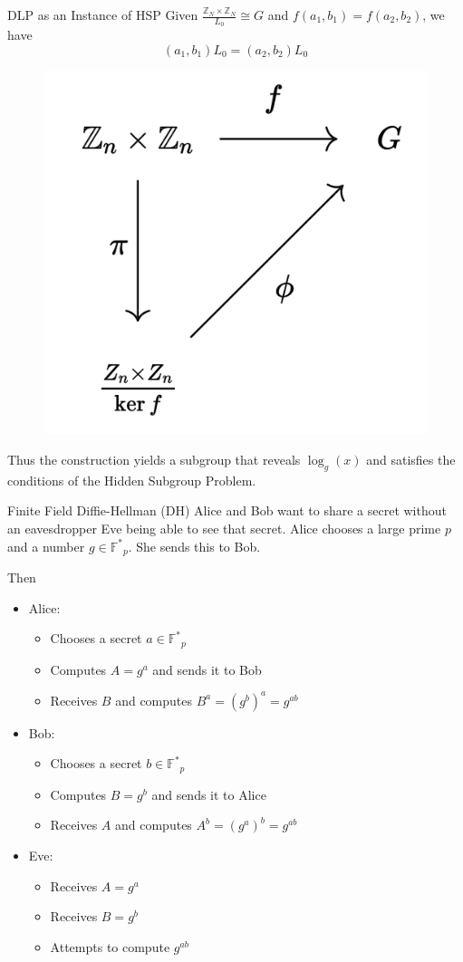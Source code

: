 \documentclass{beamer}
\begin{document}
\begin{frame}{DLP as an Instance of HSP}
    Given $\frac{\mathbb{Z}_N \times \mathbb{Z}_N}{L_0} \cong G$ and $f(a_1, b_1) = f(a_2,b_2)$, we have 
    \[(a_1, b_1)L_0 = (a_2,b_2)L_0\]
    \begin{figure}
        \centering
        \includegraphics[width=0.4\linewidth]{figures/cd.png}
    \end{figure}
    Thus the construction yields a subgroup that reveals $\log_g(x)$ and satisfies the conditions of the Hidden Subgroup Problem.
\end{frame}

\begin{frame}{Finite Field Diffie-Hellman (DH)}
    Alice and Bob want to share a secret without an eavesdropper Eve being able to see that secret. Alice chooses a large prime $p$ and a number $g \in \mathbb{F^*}_p$. She sends this to Bob.

    Then 
    \begin{itemize}
        \item Alice:
        \begin{itemize}
            \item Chooses a secret $a \in \mathbb{F^*}_p$
            \item Computes $A = g^a$ and sends it to Bob
            \item Receives $B$ and computes $B^a=(g^{b})^{a}=g^{ab}$ 
        \end{itemize}
        \item Bob:
        \begin{itemize}
            \item Chooses a secret $b \in \mathbb{F^*}_p$
            \item Computes $B = g^b$ and sends it to Alice
            \item Receives $A$ and computes $A^b=(g^{a})^{b}=g^{ab}$
        \end{itemize}
        \item Eve:
        \begin{itemize}
            \item Receives $A=g^a$
            \item Receives $B=g^b$
            \item Attempts to compute $g^{ab}$
        \end{itemize}
    \end{itemize}

\end{frame}
\end{document}
